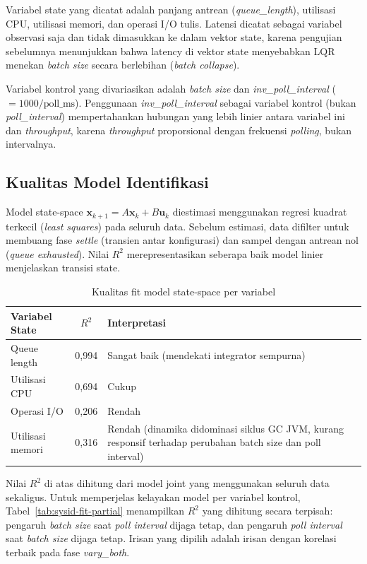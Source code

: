 Variabel state yang dicatat adalah panjang antrean (\emph{queue\_length}),
utilisasi CPU, utilisasi memori, dan operasi I/O tulis.
Latensi dicatat sebagai variabel observasi saja dan tidak dimasukkan ke dalam vektor state,
karena pengujian sebelumnya menunjukkan bahwa latency di vektor state menyebabkan LQR menekan
\emph{batch size} secara berlebihan (\emph{batch collapse}).

Variabel kontrol yang divariasikan adalah \emph{batch size} dan \emph{inv\_poll\_interval}
($= 1000 / \text{poll\_ms}$).
Penggunaan \emph{inv\_poll\_interval} sebagai variabel kontrol (bukan \emph{poll\_interval})
mempertahankan hubungan yang lebih linier antara variabel ini dan \emph{throughput},
karena \emph{throughput} proporsional dengan frekuensi \emph{polling}, bukan intervalnya.

\subsection{Kualitas Model Identifikasi}

Model state-space $\mathbf{x}_{k+1} = A\mathbf{x}_k + B\mathbf{u}_k$ diestimasi menggunakan
regresi kuadrat terkecil (\emph{least squares}) pada seluruh data.
Sebelum estimasi, data difilter untuk membuang fase \emph{settle} (transien antar
konfigurasi) dan sampel dengan antrean nol (\emph{queue exhausted}).
Nilai $R^2$ merepresentasikan seberapa baik model linier menjelaskan transisi state.

\begin{table}[H]
    \centering
    \caption{Kualitas fit model state-space per variabel}
    \label{tab:sysid-fit}
    \renewcommand{\arraystretch}{1.4}
    \begin{tabular}{|l|c|l|}
    \hline
    \textbf{Variabel State} & \textbf{$R^2$} & \textbf{Interpretasi} \\
    \hline
    Queue length & 0,994 & Sangat baik (mendekati integrator sempurna) \\
    \hline
    Utilisasi CPU & 0,694 & Cukup \\
    \hline
    Operasi I/O & 0,206 & Rendah \\
    \hline
    Utilisasi memori & 0,316 & Rendah (dinamika didominasi siklus GC JVM, kurang responsif terhadap perubahan batch size dan poll interval) \\
    \hline
    \end{tabular}
\end{table}

Nilai $R^2$ di atas dihitung dari model joint yang menggunakan seluruh data sekaligus.
Untuk memperjelas kelayakan model per variabel kontrol, Tabel~\ref{tab:sysid-fit-partial}
menampilkan $R^2$ yang dihitung secara terpisah: pengaruh \emph{batch size} saat
\emph{poll interval} dijaga tetap, dan pengaruh \emph{poll interval} saat \emph{batch size}
dijaga tetap.
Irisan yang dipilih adalah irisan dengan korelasi terbaik pada fase \emph{vary\_both}.

